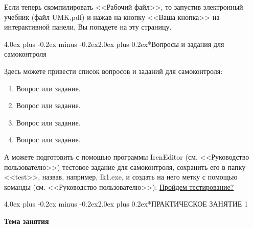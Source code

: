 \documentclass[12pt, a4paper]{book}%
\makeatletter
\renewcommand{\section}{\@startsection{section}{1}{1pt}%
{4.0ex plus -0.2ex minus -0.2ex}{2.0ex plus 0.2ex}{\centering\bf}}%
\makeatother
\begin{document}
{Если теперь скомпилировать <<Рабочий файл>>, то запустив электронный
учебник (файл UMK.pdf) и нажав на кнопку <<Ваша кнопка>> на интерактивной
панели, Вы попадете на эту страницу.


\section*{Вопросы и задания для самоконтроля}%

Здесь можете привести список вопросов и заданий для самоконтроля:
\begin{enumerate}%
\item Вопрос или задание.
\item Вопрос или задание.
\item Вопрос или задание.
\item Вопрос или задание.
\end{enumerate}%

А можете подготовить с помощью программы IrenEditor (см. <<Руководство пользователю>>)
тестовое задание для самоконтроля, сохранить его в папку
<<test>>, назвав, например, lk1.exe, и создать на него метку с помощью
команды (см. <<Руководство пользователю>>): \href{run:test/lk1.exe}{Пройдем тестирование?}

\newpage%
\section*{ПРАКТИЧЕСКОЕ ЗАНЯТИЕ 1}%
 \vspace{-10pt}%
\begin{center}%
 {\bf%
 Тема занятия}
\end{center}%

}
\end{document}
